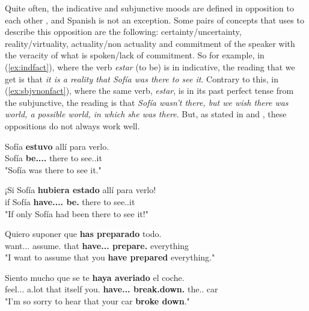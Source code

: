 Quite often, the indicative and subjunctive moods are defined in opposition to each other \citet{lyons1995linguistic}, and Spanish is not an exception. Some pairs of concepts that \citet{espanola2010nueva} uses to describe this opposition are the following: certainty/uncertainty, reality/virtuality, actuality/non actuality and commitment of the speaker with the veracity of what is spoken/lack of commitment. So for example, in (\ref{ex:indfact}), where the verb \textit{estar} (to be) is in indicative, the reading that we get is that \textit{it is a reality that Sofía was there to see it}. Contrary to this, in (\ref{ex:sbjvnonfact}), where the same verb, \textit{estar}, is in its past perfect tense from the subjunctive, the reading is that \textit{Sofía wasn't there, but we wish there was world, a possible world, in which she was there}. But, as stated in \citet{espanola2010nueva} and \citet{sanchez2011aproximacion}, these oppositions do not always work well.\\

\begin{exe}
  \ex
      \begin{xlist}
          \item {\gll Sofía \textbf{estuvo} allí para verlo. \\ Sofía \textbf{be.\Pst.\Pfv.\Ind.\Tsg{}} there to see.\Inf{}.it\\ \glt "Sofía was there to see it."}\label{ex:indfact}
            \item {\gll ¡Si Sofía \textbf{hubiera estado} allí para verlo!\\ if Sofía \textbf{have.\Pst.\Pfv.\Sbjv.\Tsg{}  be.\Ptcp{}} there to see.\Inf{}.it\\ \glt "If only Sofía had been there to see it!"}\label{ex:sbjvnonfact}
      \end{xlist}
  \ex
    \begin{xlist}
      \item  {\gll Quiero suponer que \textbf{has preparado} todo.\\   want.\Prs.\Ind.\Fsg{} assume.\Inf{} that \textbf{have.\Prs.\Ind.\Ssg{} prepare.\Ptcp{}} everything \\ \glt "I want to assume that you \textbf{have prepared} everything."}\label{ex:indnonfact}
      \item {\gll Siento mucho que se te \textbf{haya averiado} el coche.\\  feel.\Prs.\Ind.\Fsg{} a.lot that itself you.\Dat{} \textbf{have.\Prs.\Sbj.\Tsg{} break.down.\Ptcp{}} the.\M.\Sg{} car \\ \glt "I'm so sorry to hear that your car \textbf{broke down}."}\label{ex:sbjvfact}
    \end{xlist}
\end{exe}

